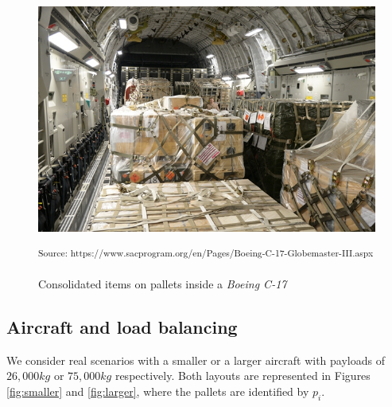 \documentclass[preprint,authoryear]{elsarticle}
\begin{document}
\begin{figure}[H]
	\centering
	\includegraphics[scale=0.4]{Images/large.png}
	\caption{Consolidated items on pallets inside a {\it Boeing C-17}}
	\small\textsuperscript{Source: https://www.sacprogram.org/en/Pages/Boeing-C-17-Globemaster-III.aspx}
	\label{fig:larger2}
\end{figure}



\subsection{Aircraft and load balancing}


We consider real scenarios with a smaller or a larger aircraft with payloads of $26,000 kg$ or $75,000 kg$ respectively. Both layouts are represented in Figures \ref{fig:smaller} and \ref{fig:larger}, where the pallets are identified by $p_i$.
\end{document}
